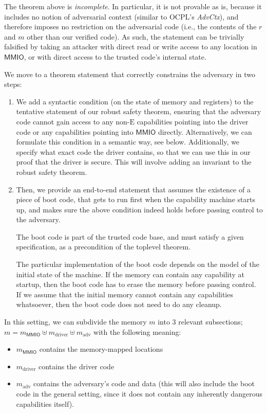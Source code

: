 \documentclass{article}
\newcommand{\X}[1]{\ensuremath{\mathrm{#1}}}
\newcommand{\Sf}[1]{\ensuremath{\mathsf{#1}}}
\newcommand{\MMIO}{\Sf{MMIO}\xspace}
\begin{document}
\bigskip

The theorem above is \emph{incomplete}. In particular, it is not provable as
is, because it includes no notion of adversarial context (similar to OCPL's
\textit{AdvCtx}), and therefore imposes no restriction on the adversarial code
(i.e., the contents of the $r$ and $m$ other than our verified code).
%
As such, the statement can be trivially falsified by taking an attacker with
direct read or write access to any location in \MMIO, or with direct access to
the trusted code's internal state.

We move to a theorem statement that correctly constrains the adversary in two
steps:
%
\begin{enumerate}
  \item We add a syntactic condition (on the state of memory and registers) to
    the tentative statement of our robust safety theorem, ensuring that the
    adversary code cannot gain access to any non-$\X{E}$ capabilities pointing into
    the driver code or any capabilities pointing into $\MMIO$ directly.
    Alternatively, we can formulate this condition in a semantic way, see below.
    Additionally, we specify what exact code the driver contains, so that we can
    use this in our proof that the driver is secure. This will involve adding an
    invariant to the robust safety theorem.
%
  \item Then, we provide an end-to-end statement that assumes the existence of a
    piece of boot code, that gets to run first when the capability machine
    starts up, and makes sure the above condition indeed holds before passing
    control to the adversary.

    The boot code is part of the trusted code base, and must satisfy a given
    specification, as a precondition of the toplevel theorem.

    The particular implementation of the boot code depends on the model of the
    initial state of the machine. If the memory can contain any capability at
    startup, then the boot code has to erase the memory before passing control.
    If we assume that the initial memory cannot contain any capabilities
    whatsoever, then the boot code does not need to do any cleanup.
\end{enumerate}

In this setting, we can subdivide the memory $m$ into 3 relevant subsections;
$m = m_{\MMIO} \uplus m_{\X{driver}} \uplus m_{\X{adv}}$ %
with the following meaning:
\begin{itemize}
\item $m_{\MMIO}$ contains the memory-mapped locations
\item $m_{\X{driver}}$ contains the driver code
\item  $m_{\X{adv}}$ contains the adversary's code and data (this will also
  include the boot code in the general setting, since it does not contain any
  inherently dangerous capabilities itself).
\end{itemize}
\end{document}
